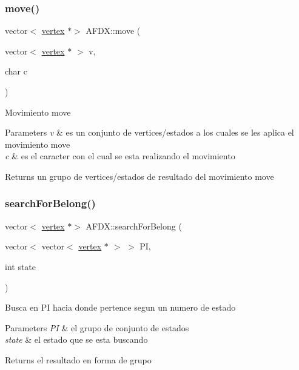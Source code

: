 \subsubsection{\texorpdfstring{move()}{move()}}
{\footnotesize\ttfamily vector$<$ \hyperlink{structvertex}{vertex} $\ast$$>$ A\+F\+D\+X\+::move (\begin{DoxyParamCaption}\item[{vector$<$ \hyperlink{structvertex}{vertex} $\ast$ $>$}]{v,  }\item[{char}]{c }\end{DoxyParamCaption})}

Movimiento move 
\begin{DoxyParams}{Parameters}
{\em v} & es un conjunto de vertices/estados a los cuales se les aplica el movimiento move \\
\hline
{\em c} & es el caracter con el cual se esta realizando el movimiento \\
\hline
\end{DoxyParams}
\begin{DoxyReturn}{Returns}
un grupo de vertices/estados de resultado del movimiento move 
\end{DoxyReturn}
\hypertarget{class_a_f_d_x_a333de4006f306b7ebfa295b95ebb6626}{}\label{class_a_f_d_x_a333de4006f306b7ebfa295b95ebb6626} 
\subsubsection{\texorpdfstring{search\+For\+Belong()}{searchForBelong()}}
{\footnotesize\ttfamily vector$<$ \hyperlink{structvertex}{vertex} $\ast$$>$ A\+F\+D\+X\+::search\+For\+Belong (\begin{DoxyParamCaption}\item[{vector$<$ vector$<$ \hyperlink{structvertex}{vertex} $\ast$ $>$ $>$}]{PI,  }\item[{int}]{state }\end{DoxyParamCaption})}

Busca en PI hacia donde pertence segun un numero de estado 
\begin{DoxyParams}{Parameters}
{\em PI} & el grupo de conjunto de estados \\
\hline
{\em state} & el estado que se esta buscando \\
\hline
\end{DoxyParams}
\begin{DoxyReturn}{Returns}
el resultado en forma de grupo 
\end{DoxyReturn}
\hypertarget{class_a_f_d_x_ae47ecdcac8ec88b22d88fa1bfa52f781}{}\label{class_a_f_d_x_ae47ecdcac8ec88b22d88fa1bfa52f781} 
